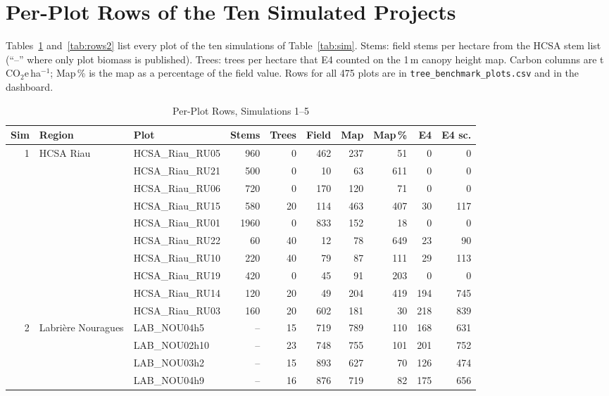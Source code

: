 \documentclass[conference,a4paper]{IEEEtran}
\begin{document}
\appendices
\section{Per-Plot Rows of the Ten Simulated Projects}
\label{app:rows}
Tables~\ref{tab:rows1} and~\ref{tab:rows2} list every plot of the ten simulations of Table~\ref{tab:sim}. Stems: field stems per hectare from the HCSA stem list (``--'' where only plot biomass is published). Trees: trees per hectare that E4 counted on the 1\,m canopy height map. Carbon columns are t\,CO$_2$e\,ha$^{-1}$; Map\,\% is the map as a percentage of the field value. Rows for all 475 plots are in \texttt{tree\_benchmark\_plots.csv} and in the dashboard.

\begin{table}[!t]
\centering
\caption{Per-Plot Rows, Simulations 1--5}
\label{tab:rows1}
\scriptsize
\setlength{\tabcolsep}{4pt}
\begin{tabular}{@{}r l l r r r r r r r@{}}
\toprule
\textbf{Sim} & \textbf{Region} & \textbf{Plot} & \textbf{Stems} & \textbf{Trees} & \textbf{Field} & \textbf{Map} & \textbf{Map\,\%} & \textbf{E4} & \textbf{E4 sc.}\\
\midrule
1 & HCSA Riau & HCSA\_Riau\_RU05 & 960 & 0 & 462 & 237 & 51 & 0 & 0\\
 &  & HCSA\_Riau\_RU21 & 500 & 0 & 10 & 63 & 611 & 0 & 0\\
 &  & HCSA\_Riau\_RU06 & 720 & 0 & 170 & 120 & 71 & 0 & 0\\
 &  & HCSA\_Riau\_RU15 & 580 & 20 & 114 & 463 & 407 & 30 & 117\\
 &  & HCSA\_Riau\_RU01 & 1960 & 0 & 833 & 152 & 18 & 0 & 0\\
 &  & HCSA\_Riau\_RU22 & 60 & 40 & 12 & 78 & 649 & 23 & 90\\
 &  & HCSA\_Riau\_RU10 & 220 & 40 & 79 & 87 & 111 & 29 & 113\\
 &  & HCSA\_Riau\_RU19 & 420 & 0 & 45 & 91 & 203 & 0 & 0\\
 &  & HCSA\_Riau\_RU14 & 120 & 20 & 49 & 204 & 419 & 194 & 745\\
 &  & HCSA\_Riau\_RU03 & 160 & 20 & 602 & 181 & 30 & 218 & 839\\
\midrule
2 & Labri\`ere Nouragues & LAB\_NOU04h5 & -- & 15 & 719 & 789 & 110 & 168 & 631\\
 &  & LAB\_NOU02h10 & -- & 23 & 748 & 755 & 101 & 201 & 752\\
 &  & LAB\_NOU03h2 & -- & 15 & 893 & 627 & 70 & 126 & 474\\
 &  & LAB\_NOU04h9 & -- & 16 & 876 & 719 & 82 & 175 & 656\\

\end{tabular}
\end{table}
\end{document}
